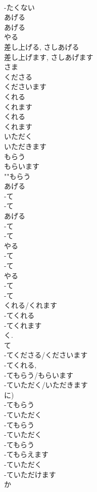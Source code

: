 \documentclass[8pt]{extreport}
\begin{document}
\begin{CJK}{UTF8}{min}
\\	-たくない	
\\	あげる	
\\	あげる	
\\	やる	
\\	差し上げる, さしあげる 
\\	差し上げます, さしあげます	
\\	さま 
\\	くださる 
\\	くださいます	
\\	くれる 
\\	くれます	
\\	くれる 
\\	くれます	
\\	いただく 
\\	いただきます	
\\	もらう 
\\	もらいます	
\\	""もらう
\\	あげる 
\\	-て 
\\	-て 
\\	あげる	
\\	-て 
\\	-て 
\\	やる	
\\	-て 
\\	-て 
\\	やる	
\\	-て 
\\	-て 
\\	くれる/くれます	
\\	-てくれる 
\\	-てくれます 
\\	く. 
\\	て 
\\	-てくださる/くださいます	
\\	-てくれる, 
\\	-てもらう/もらいます 
\\	-ていただく/いただきます 
\\	に)
\\	-てもらう 
\\	-ていただく	
\\	-てもらう 
\\	-ていただく	
\\	-てもらう 
\\	-てもらえます 
\\	-ていただく 
\\	-ていただけます
\\	か 

\end{CJK}
\end{document}
